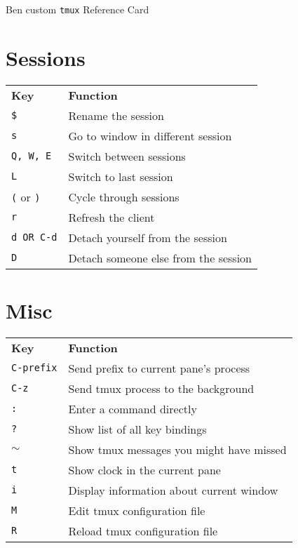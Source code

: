 \documentclass[landscape]{article}
\newcommand{\thead}[1]{{\color{black}\bf#1}}
\newcommand{\blankfirst}{%
  \ifodd\rownum\advance\rownum1\relax\fi}
\begin{document}
\thispagestyle{empty}
\begin{center}
  \Huge Ben custom \texttt{tmux} Reference Card %
\end{center}

\begin{multicols}{3}
  \small
  \section*{Sessions}
  \blankfirst
  \noindent\begin{tabular}{p{0.6in}p{2.3in}} %
    \thead{Key} & \thead{Function}\\
    \verb|$| & Rename the session\\
    \verb|s| & Go to window in different session\\
    \verb|Q, W, E| & Switch between sessions\\
    \verb|L| & Switch to last session\\
    \verb|(| or \verb|)| & Cycle through sessions\\
    \verb|r| & Refresh the client\\
    \verb|d OR C-d| & Detach yourself from the session\\
    \verb|D| & Detach someone else from the session\\
  \end{tabular}

  \section*{Misc}
  \blankfirst
  \noindent\begin{tabular}{p{0.6in}p{2.3in}} %
    \thead{Key} & \thead{Function}\\
    \verb|C-prefix| & Send prefix to current pane's process\\
    \verb|C-z| & Send tmux process to the background\\
    \verb|:| & Enter a command directly\\
    \verb|?| & Show list of all key bindings\\
    $\mathtt \sim$ & Show tmux messages you might have missed\\
    \verb|t| & Show clock in the current pane\\
    \verb|i| & Display information about current window\\
    \verb|M| & Edit tmux configuration file\\
    \verb|R| & Reload tmux configuration file\\
  \end{tabular}  


\end{multicols}
\end{document}
